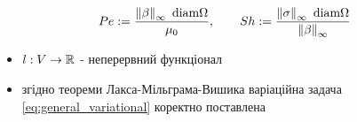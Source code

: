\begin{frame}[allowframebreaks]
	\begin{equation}
		Pe:= \frac{\left\lVert\beta\right\rVert_\infty \text{ diam} \Omega}{\mu_0}, \qquad
		Sh:= \frac{\left\lVert\sigma\right\rVert_\infty \text{ diam} \Omega}{\left\lVert\beta\right\rVert_\infty}
	\end{equation}

	\begin{itemize}
		\item $l : V \to \mathbb{R}$ - неперервний функціонал
		\item згідно теореми Лакса-Мільграма-Вишика варіаційна задача \eqref{eq:general_variational} коректно поставлена
	\end{itemize}
\end{frame}

\undeff{\vonenorm}
